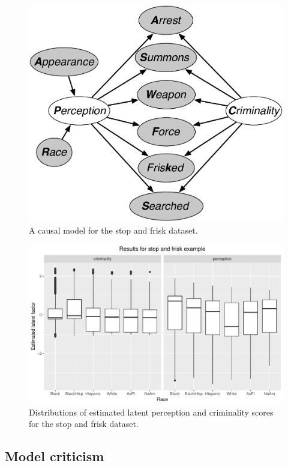 \begin{figure}[th]
\begin{center}
\vspace{-1ex}
\centerline{\includegraphics[width=\columnwidth]{stop_and_frisk_model3.pdf}}
\vspace{-2ex}
\caption{A causal model for the stop and frisk dataset.\label{figure.stop_and_frisk}}
\vspace{-2ex}
\end{center}
\end{figure}

\begin{figure}[th]
\begin{center}
\vspace{-1ex}
\centerline{\includegraphics[width=\columnwidth]{stopandfrisk_output.pdf}}
\vspace{-2ex}
\caption{Distributions of estimated latent perception and criminality scores for the stop and frisk dataset.\label{figure.stop_and_frisk_output}}
\vspace{-2ex}
\end{center}
\end{figure}

\subsection{Model criticism}